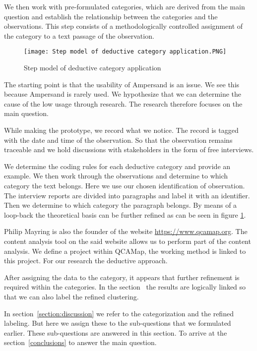 We then work with pre-formulated categories, which are derived from the main question and establish the relationship between the categories and the observations.
This step consists of a methodologically controlled assignment of the category to a text passage of the observation.
\begin{figure}[H]
    \centering
    \texttt{[image: Step model of deductive category application.PNG]}
    \caption{Step model of deductive category application\citep{mayring_qualitative_2000}}
    \label{fig:step-model-of-deductive-category-application}
\end{figure}

The starting point is that the usability of Ampersand is an issue.
We see this because Ampersand is rarely used.
We hypothesize that we can determine the cause of the low usage through research.
The research therefore focuses on the main question.

While making the prototype, we record what we notice.
The record is tagged with the date and time of the observation.
So that the observation remains traceable and we hold discussions with stakeholders in the form of free interviews.

We determine the coding rules for each deductive category and  provide an example.
We then work through the observations and determine to which category the text belongs.
Here we use our chosen identification of observation.
The interview reports are divided into paragraphs and label it with an identifier.
Then we determine to which category the paragraph belongs.
By means of a loop-back the theoretical basis can be further refined as can be seen in figure \ref{fig:step-model-of-deductive-category-application}.

Philip Mayring is also the founder of the website \url{https://www.qcamap.org}.
The content analysis tool on the said website allows us to perform part of the content analysis.
We define a project within QCAMap, the working method is linked to this project.
For our research the deductive approach.

After assigning the data to the category, it appears that further refinement is required within the categories.
In the section~ the results are logically linked so that we can also label the refined clustering.

In section~\ref{section:discussion} we refer to the categorization and the refined labeling.
But here we assign these to the sub-questions that we formulated earlier.
These sub-questions are answered in this section.
To arrive at the section~\ref{conclusions} to answer the main question.



